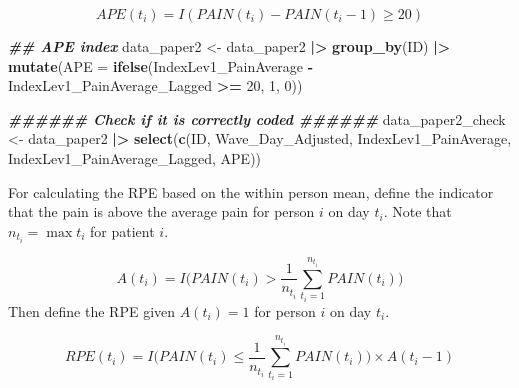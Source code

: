 \documentclass[
  12pt,
]{article}
\newenvironment{Shaded}{\begin{snugshade}}{\end{snugshade}}
\newcommand{\AttributeTok}[1]{\textcolor[rgb]{0.13,0.29,0.53}{#1}}
\newcommand{\DecValTok}[1]{\textcolor[rgb]{0.00,0.00,0.81}{#1}}
\newcommand{\DocumentationTok}[1]{\textcolor[rgb]{0.56,0.35,0.01}{\textbf{\textit{#1}}}}
\newcommand{\FunctionTok}[1]{\textcolor[rgb]{0.13,0.29,0.53}{\textbf{#1}}}
\newcommand{\NormalTok}[1]{#1}
\newcommand{\OtherTok}[1]{\textcolor[rgb]{0.56,0.35,0.01}{#1}}
\newcommand{\SpecialCharTok}[1]{\textcolor[rgb]{0.81,0.36,0.00}{\textbf{#1}}}
\begin{document}
\[
APE(t_i)=I(PAIN(t_i)-PAIN(t_i-1) \geq 20)
\]

\begin{Shaded}
\begin{Highlighting}[]
\DocumentationTok{\#\# APE index}
\NormalTok{data\_paper2 }\OtherTok{\textless{}{-}}\NormalTok{ data\_paper2 }\SpecialCharTok{|\textgreater{}}
  \FunctionTok{group\_by}\NormalTok{(ID) }\SpecialCharTok{|\textgreater{}}
  \FunctionTok{mutate}\NormalTok{(}\AttributeTok{APE =} \FunctionTok{ifelse}\NormalTok{(IndexLev1\_PainAverage }\SpecialCharTok{{-}}\NormalTok{ IndexLev1\_PainAverage\_Lagged }\SpecialCharTok{\textgreater{}=} \DecValTok{20}\NormalTok{, }\DecValTok{1}\NormalTok{, }\DecValTok{0}\NormalTok{))}

\DocumentationTok{\#\#\#\#\#\# Check if it is correctly coded \#\#\#\#\#\#}
\NormalTok{data\_paper2\_check }\OtherTok{\textless{}{-}}\NormalTok{ data\_paper2 }\SpecialCharTok{|\textgreater{}}
  \FunctionTok{select}\NormalTok{(}\FunctionTok{c}\NormalTok{(ID, Wave\_Day\_Adjusted, }
\NormalTok{           IndexLev1\_PainAverage, }
\NormalTok{           IndexLev1\_PainAverage\_Lagged, }
\NormalTok{           APE))}
\end{Highlighting}
\end{Shaded}

For calculating the RPE based on the within person mean, define the
indicator that the pain is above the average pain for person \(i\) on
day \(t_i\). Note that \(n_{t_i}=\max{t_i}\) for patient \(i\).

\[
A(t_i)=I\Big(PAIN(t_i)>\frac{1}{n_{t_i}}\sum_{t_i=1}^{n_{t_i}}PAIN(t_i)\Big)
\] Then define the RPE given \(A(t_i)=1\) for person \(i\) on day
\(t_i\).

\[
RPE(t_i)=I\Big(PAIN(t_i)\leq \frac{1}{n_{t_i}}\sum_{t_i=1}^{n_{t_i}}PAIN(t_i)\Big)\times A(t_i-1)
\]
\end{document}
